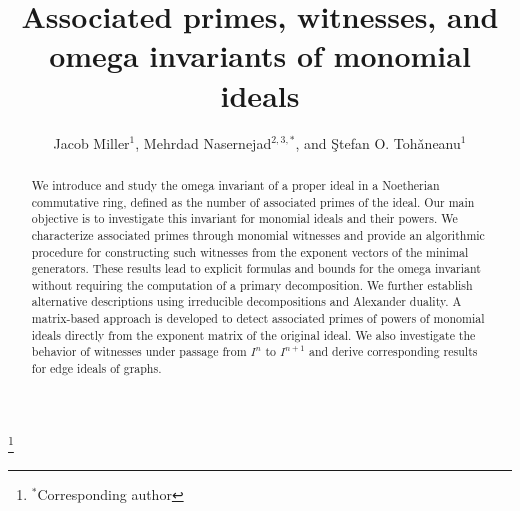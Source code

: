 \documentclass[11pt]{amsart}   %
\begin{document}
\newcommand{\defref}[1]{Definition~\ref{#1}}
\newcommand{\propref}[1]{Proposition~\ref{#1}}
\newcommand{\thmref}[1]{Theorem~\ref{#1}}
\newcommand{\lemref}[1]{Lemma~\ref{#1}}
\newcommand{\corref}[1]{Corollary~\ref{#1}}
\newcommand{\exref}[1]{Example~\ref{#1}}
\newcommand{\secref}[1]{Section~\ref{#1}}
\newcommand{\remref}[1]{Remark~\ref{#1}}
\newcommand{\questref}[1]{Question~\ref{#1}}
\newcommand{\probref}[1]{Problem~\ref{#1}}
\newcommand{\conjref}[1]{Conjecture~\ref{#1}}

\newcommand{\std}{Gr\"{o}bner}
\newcommand{\jq}{J_{Q}}
\def\Ree#1{{\mathcal R}(#1)}


\title{Associated primes, witnesses, and omega invariants of monomial ideals}

\author[J. Miller,
M.  Nasernejad,
and \c{S}. O. Toh\v{a}neanu]{
Jacob Miller$^{1}$,
Mehrdad Nasernejad$^{2,3,*}$,
and \c{S}tefan O. Toh\v{a}neanu$^{1}$
}
\thanks{$^*$Corresponding author}




 

\begin{abstract}
We introduce and study the omega invariant of a proper ideal in a Noetherian commutative ring, defined as the number of associated primes of the ideal. Our main objective is to investigate this invariant for monomial ideals and their powers. We characterize associated primes through monomial witnesses and provide an algorithmic procedure for constructing such witnesses from the exponent vectors of the minimal generators. These results lead to explicit formulas and bounds for the omega invariant without requiring the computation of a primary decomposition. We further establish alternative descriptions using irreducible decompositions and Alexander duality. A matrix-based approach is developed to detect associated primes of powers of monomial ideals directly from the exponent matrix of the original ideal. We also investigate the behavior of witnesses under passage from $I^n$ to $I^{n+1}$ and derive corresponding results for edge ideals of graphs. 
\end{abstract}
\end{document}
